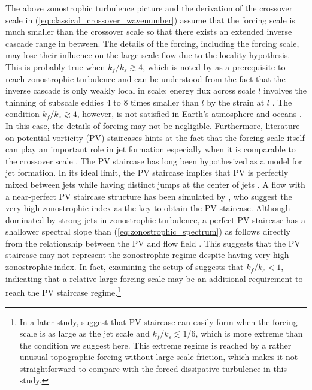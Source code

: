 \documentclass{ametsoc}
\begin{document}
The above zonostrophic turbulence picture and the derivation of
the crossover scale in (\ref{eq:classical_crossover_wavenumber}) assume
that the forcing scale is much smaller than the crossover scale so that
there exists an extended inverse cascade range in between.
The details of the forcing, including the forcing scale,
may lose their influence on the large scale flow due to
the locality hypothesis. This is probably true when $k_{f}/k_{\varepsilon}\apprge4$,
which is noted by \citet{Sukoriansky2007} as a prerequisite
to reach zonostrophic turbulence and can be understood from the fact
that the inverse cascade is only weakly local in scale: 
energy flux across scale $l$ involves
the thinning of subscale eddies 4 to 8 times smaller than $l$ by
the strain at $l$ \citep{Chen2006}.
The condition $k_{f}/k_{\varepsilon}\apprge4$, however, 
is not satisfied in Earth's atmosphere \citep{Schneider2006,Merlis2009}
and oceans \citep{Tulloch2011}. In this case, the details of
forcing may not be negligible. Furthermore, literature 
on potential vorticity (PV) staircases hints at the fact that
the forcing scale itself can play an important role 
in jet formation especially when it is comparable to the crossover scale \citep{Scott2012}.
The PV staircase has long been hypothesized as a model for jet formation.
In its ideal limit, the PV staircase implies that PV is
perfectly mixed between jets while having distinct jumps at the center
of jets \citep{Marcus1993,Marcus1998,Dunkerton2008,Dritschel2008}.
A flow with a near-perfect PV staircase structure has been 
simulated by \citet{Scott2012}, who suggest the very high
zonostrophic index as the key to obtain the PV staircase. 
Although dominated by strong jets in zonostrophic turbulence,
a perfect PV staircase has a shallower spectral slope than
(\ref{eq:zonostrophic_spectrum}) as follows directly from the
relationship between the PV and flow field \citep{Saffman1971,Danilov2004}.
This suggests that the PV staircase may not represent the zonostrophic
regime despite having very high zonostrophic index. In fact,
examining the setup of \citet{Scott2012} suggests that 
$k_{f}/k_{\varepsilon}<1$, indicating that a relative large forcing
scale may be an additional requirement to reach the PV staircase regime.\footnote{
In a later study, \citet{Scott2012a} suggest that PV staircase can
easily form when the forcing scale is as large as the jet scale and
$k_{f}/k_{\varepsilon}\apprle1/6$, which is more extreme than the
condition we suggest here. This extreme regime is reached by a rather
unusual topographic forcing without large scale friction, which makes
it not straightforward to compare with the forced-dissipative turbulence
in this study.} 
\end{document}
